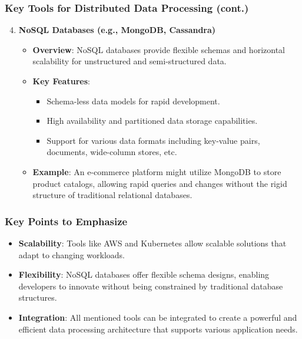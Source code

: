 \documentclass[aspectratio=169]{beamer}
\begin{document}
\begin{frame}[fragile]
  \frametitle{Key Tools for Distributed Data Processing (cont.)}
  \begin{enumerate}
    \setcounter{enumi}{3} %
    \item \textbf{NoSQL Databases (e.g., MongoDB, Cassandra)}
      \begin{itemize}
        \item \textbf{Overview}: NoSQL databases provide flexible schemas and horizontal scalability for unstructured and semi-structured data.
        \item \textbf{Key Features}:
          \begin{itemize}
            \item Schema-less data models for rapid development.
            \item High availability and partitioned data storage capabilities.
            \item Support for various data formats including key-value pairs, documents, wide-column stores, etc.
          \end{itemize}
        \item \textbf{Example}: An e-commerce platform might utilize MongoDB to store product catalogs, allowing rapid queries and changes without the rigid structure of traditional relational databases.
      \end{itemize}
  \end{enumerate}
\end{frame}

\begin{frame}[fragile]
  \frametitle{Key Points to Emphasize}
  \begin{itemize}
    \item \textbf{Scalability}: Tools like AWS and Kubernetes allow scalable solutions that adapt to changing workloads.
    \item \textbf{Flexibility}: NoSQL databases offer flexible schema designs, enabling developers to innovate without being constrained by traditional database structures.
    \item \textbf{Integration}: All mentioned tools can be integrated to create a powerful and efficient data processing architecture that supports various application needs.
  \end{itemize}
\end{frame}
\end{document}
